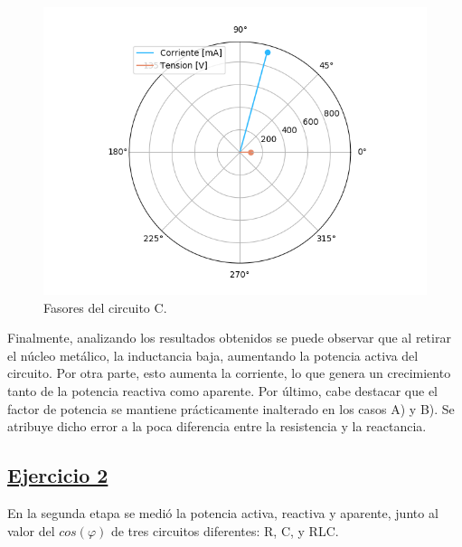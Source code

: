 \documentclass[a4paper]{article}
\begin{document}
\begin{figure}[H]
\centering
\begin{minipage}{.5\textwidth}
	\centering
	\includegraphics[width=1.2\linewidth]{Fasorial-1C.png}
	\caption{Fasores del circuito C.}
	\label{fig:faso-1c}
\end{minipage}
\end{figure}

Finalmente, analizando los resultados obtenidos se puede observar que al retirar el núcleo metálico, la inductancia baja, aumentando la potencia activa del circuito. Por otra parte, esto aumenta la corriente, lo que genera un crecimiento tanto de la potencia reactiva como aparente. Por último, cabe destacar que el factor de potencia se mantiene prácticamente inalterado en los casos A) y B). Se atribuye dicho error a la poca diferencia entre la resistencia y la reactancia.

\subsection*{\underline{Ejercicio 2}}

En la segunda etapa se medió la potencia activa, reactiva y aparente, junto al valor del $cos(\varphi)$ de tres circuitos diferentes: R, C, y RLC.
\end{document}
